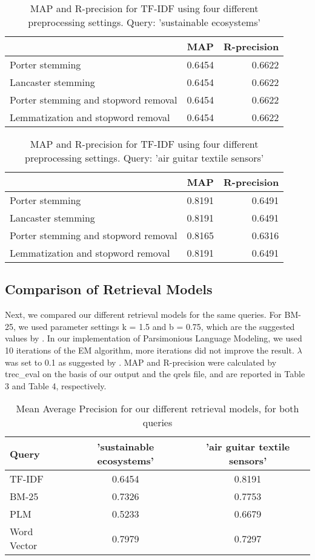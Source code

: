 \documentclass{article}
\begin{document}
\begin{table}[h]
\begin{tabular}{|l|c|r|}
\hline
 & MAP & R-precision \\ \hline
Porter stemming & 0.6454 & 0.6622 \\ \hline
Lancaster stemming & 0.6454 & 0.6622 \\ \hline
Porter stemming and stopword removal & 0.6454 & 0.6622 \\ \hline
Lemmatization and stopword removal & 0.6454 & 0.6622 \\ \hline
\end{tabular}
\caption{MAP and R-precision for TF-IDF using four different preprocessing settings. Query: 'sustainable ecosystems'}
\end{table}
\begin{table}[h]
\begin{tabular}{|l|c|r|}
\hline
 & MAP & R-precision \\ \hline
Porter stemming & 0.8191 & 0.6491 \\ \hline
Lancaster stemming & 0.8191 & 0.6491 \\ \hline
Porter stemming and stopword removal & 0.8165 & 0.6316 \\ \hline
Lemmatization and stopword removal & 0.8191 & 0.6491 \\ \hline
\end{tabular}
\caption{MAP and R-precision for TF-IDF using four different preprocessing settings. Query: 'air guitar textile sensors'} 
\end{table} 

\subsection*{Comparison of Retrieval Models}

Next, we compared our different retrieval models for the same queries. For BM-25, we used parameter settings k = 1.5 and b = 0.75, which are the suggested values by \cite{robertson1995okapi}. In our implementation of Parsimonious Language Modeling, we used 10 iterations of the EM algorithm, more iterations did not improve the result. $\lambda$ was set to 0.1 as suggested by \cite{hiemstra2004parsimonious} . MAP and R-precision were calculated by trec\_eval on the basis of our output and the qrels file, and are reported in Table 3 and Table 4, respectively.

\begin{table}[h]
\caption{Mean Average Precision for our different retrieval models, for both queries}
\begin{tabular}{|l|c|c|}
\hline
Query & 'sustainable ecosystems' & 'air guitar textile sensors' \\ \hline
TF-IDF & 0.6454 & 0.8191 \\ \hline
BM-25 & 0.7326 & 0.7753 \\ \hline
PLM & 0.5233 & 0.6679 \\ \hline
Word Vector & 0.7979	 & 0.7297 \\ \hline
\end{tabular}
\end{table}
\end{document}
